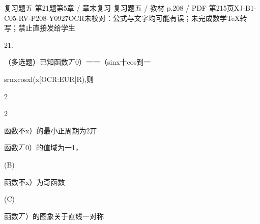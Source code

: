 \begin{bankitem}{复习题五 第21题}{第5章 / 章末复习 复习题五 / 教材 p.208 / PDF 第215页}{XJ-B1-C05-RV-P208-Y0927}{OCR未校对：公式与文字均可能有误；未完成数学TeX转写；禁止直接发给学生}
\begin{ocrdraft}
\par
21.
\par
（多选题）已知函数丆0）一一（sinx十cos到一
\par
srnxcosxl(x\ensuremath{\text{[OCR:EUR]}}R),则
\par
2
\par
2
\par
函数不x）的最小正周期为2丌
\par
函数丆0）的值域为一1，
\par
(B)
\par
函数不x）为奇函数
\par
(C)
\par
函数丆）的图象关于直线一对称
\end{ocrdraft}
\end{bankitem}
